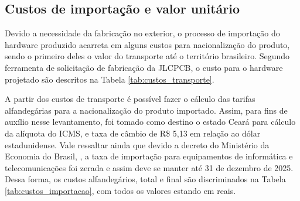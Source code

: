 \subsection{Custos de importação e valor unitário}

Devido a necessidade da fabricação no exterior, o processo de importação do hardware produzido acarreta em alguns custos para nacionalização do produto, sendo o primeiro deles o valor do transporte até o território brasileiro. Segundo ferramenta de solicitação de fabricação da JLCPCB, o custo para o hardware projetado são descritos na Tabela \ref{tab:custos_transporte}.

	\begin{table}[!h]
	\captionsetup{width=9cm}%
	\end{table}


A partir dos custos de transporte é possível fazer o cálculo das tarifas alfandegárias para a nacionalização do produto importado. Assim, para fins de auxílio nesse levantamento, foi tomado como destino o estado Ceará para cálculo da alíquota do \gls{ICMS}, e taxa de câmbio de R\$ 5,13 em relação ao dólar estadunidense. Vale ressaltar ainda que devido a decreto do Ministério da Economia do Brasil, , a taxa de importação para equipamentos de informática e telecomunicações foi zerada e assim deve se manter até 31 de dezembro de 2025. Dessa forma, os custos alfandegários, total e final são discriminados na Tabela \ref{tab:custos_importacao}, com todos os valores estando em reais.


